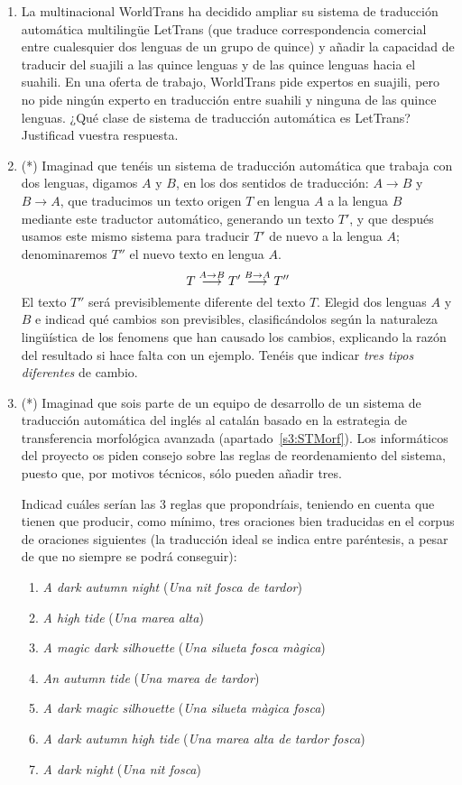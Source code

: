 \begin{enumerate}
\item La multinacional WorldTrans ha decidido ampliar su sistema de traducción automática multilingüe LetTrans (que traduce correspondencia comercial entre cualesquier dos lenguas de un grupo de quince) y añadir la capacidad de traducir del suajili a las quince lenguas y de las quince lenguas hacia el suahili. En una oferta de trabajo, WorldTrans pide expertos en suajili, pero no pide ningún experto en traducción entre suahili y ninguna de las quince lenguas. ¿Qué clase de sistema de traducción automática es LetTrans? Justificad vuestra respuesta. 

\item (*) Imaginad que tenéis un sistema de traducción automática que trabaja con dos lenguas, digamos $A$ y $B$, en los dos sentidos de traducción: $A{\rightarrow}B$ y $B{\rightarrow}A$, que traducimos un texto origen $T$ en lengua $A$ a la lengua $B$ mediante este traductor automático, generando un texto $T'$, y que después usamos este mismo sistema para traducir $T'$ de nuevo a la lengua $A$; denominaremos $T''$ el nuevo texto en lengua $A$. \begin{equation} T \stackrel{\scriptsize A\rightarrow B}{\longrightarrow}T'\stackrel{\scriptsize B\rightarrow A}{\longrightarrow} T'' \end{equation} El texto $T''$ será previsiblemente diferente del texto $T$. Elegid dos lenguas $A$ y $B$ e indicad qué cambios son previsibles, clasificándolos según la naturaleza lingüística de los fenomens que han causado los cambios, explicando la razón del resultado si hace falta con un ejemplo. Tenéis que indicar \emph{tres tipos diferentes} de cambio. 

\item (*) Imaginad que sois parte de un equipo de desarrollo de un sistema de traducción automática del inglés al catalán basado en la estrategia de transferencia morfológica avanzada (apartado~\ref{s3:STMorf}). Los informáticos del proyecto os piden consejo sobre las reglas de reordenamiento del sistema, puesto que, por motivos técnicos, sólo pueden añadir tres. 

Indicad cuáles serían las 3 reglas que propondríais, teniendo en cuenta que tienen que producir, como mínimo, tres oraciones bien traducidas en el corpus de oraciones siguientes (la traducción ideal se indica entre paréntesis, a pesar de que no siempre se podrá conseguir): \begin{enumerate} \item \emph{A dark autumn night} (\emph{Una nit fosca de tardor}) \item \emph{A high tide} (\emph{Una marea alta}) \item \emph{A magic dark silhouette} (\emph{Una silueta fosca màgica}) \item \emph{An autumn tide} (\emph{Una marea de tardor}) \item \emph{A dark magic silhouette} (\emph{Una silueta màgica fosca}) \item \emph{A dark autumn high tide} (\emph{Una marea alta de tardor fosca}) \item \emph{A dark night} (\emph{Una nit fosca}) \end{enumerate} 


\end{enumerate}
